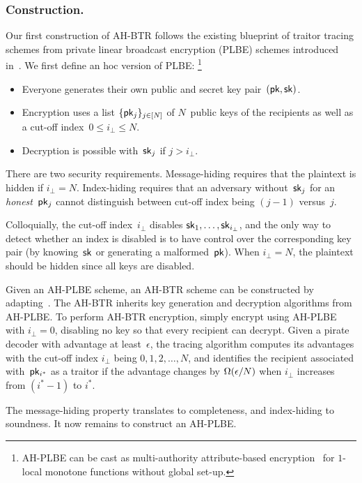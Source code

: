 \subsubsection{Construction.}
Our first construction of AH-BTR follows the existing blueprint of traitor tracing schemes from private linear broadcast encryption (PLBE) schemes introduced in~\cite{EC:BonSahWat06}.
We first define an \ad hoc version of PLBE:%
\footnote{AH-PLBE can be cast as multi-authority attribute-based encryption~\cite{TCC:Chase07} for $1$-local monotone functions without global set-up.}
\begin{itemize}
\item Everyone generates their own public and secret key pair~$(\pk,\sk)$.
\item Encryption uses a list $\{\pk_j\}_{j\in[N]}$ of $N$~public keys of the recipients as well as a cut-off index~${0\leq i_\bot\leq N}$.
\item Decryption is possible with~$\sk_j$ if ${j>i_\bot}$.
\end{itemize}
There are two security requirements.
Message-hiding requires that the plaintext is hidden if ${i_\bot=N}$.
Index-hiding requires that an adversary without~$\sk_j$ for an \emph{honest}~$\pk_j$ cannot distinguish between cut-off index being ${(j-1)}$ versus~$j$.

Colloquially, the cut-off index~$i_\bot$ disables $\sk_1,\dots,\sk_{i_\bot}$, and
the only way to detect whether an index is disabled is to have control over the corresponding key pair (by knowing~$\sk$ or generating a malformed~$\pk$).
When ${i_\bot=N}$, the plaintext should be hidden since all keys are disabled.

Given an AH-PLBE scheme, an AH-BTR scheme can be constructed by adapting~\cite{EC:BonSahWat06}.
The AH-BTR inherits key generation and decryption algorithms from AH-PLBE.
To perform AH-BTR encryption, simply encrypt using AH-PLBE with ${i_\bot=0}$, disabling no key so that every recipient can decrypt.
Given a pirate decoder with advantage at least~$\epsilon$, the tracing algorithm computes its advantages with the cut-off index $i_\bot$ being ${0,1},\allowbreak{2,\dots,N}$, and identifies the recipient associated with~$\pk_{i^\ast}$ as a traitor if the advantage changes by $\bigOmega(\epsilon/N)$ when $i_\bot$ increases from $({i^\ast-1})$ to $i^\ast$.

The message-hiding property translates to completeness, and index-hiding to soundness.
It now remains to construct an AH-PLBE.

